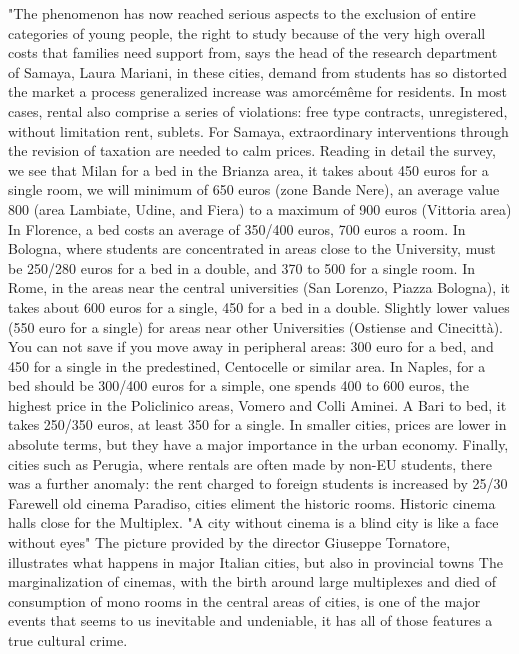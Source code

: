 "The phenomenon has now reached serious aspects to the exclusion of entire categories of young people, the right to study because of the very high overall costs that families need support from, says the head of the research department of Samaya, Laura Mariani, in these cities, demand from students has so distorted the market a process generalized increase was amorcémême for residents.
In most cases, rental also comprise a series of violations: free type contracts, unregistered, without limitation rent, sublets.
For Samaya, extraordinary interventions through the revision of taxation are needed to calm prices.
Reading in detail the survey, we see that Milan for a bed in the Brianza area, it takes about 450 euros for a single room, we will minimum of 650 euros (zone Bande Nere), an average value 800 (area Lambiate, Udine, and Fiera) to a maximum of 900 euros (Vittoria area)
In Florence, a bed costs an average of 350/400 euros, 700 euros a room.
In Bologna, where students are concentrated in areas close to the University, must be 250/280 euros for a bed in a double, and 370 to 500 for a single room.
In Rome, in the areas near the central universities (San Lorenzo, Piazza Bologna), it takes about 600 euros for a single, 450 for a bed in a double.
Slightly lower values ​​(550 euro for a single) for areas near other Universities (Ostiense and Cinecittà).
You can not save if you move away in peripheral areas: 300 euro for a bed, and 450 for a single in the predestined, Centocelle or similar area.
In Naples, for a bed should be 300/400 euros for a simple, one spends 400 to 600 euros, the highest price in the Policlinico areas, Vomero and Colli Aminei.
A Bari to bed, it takes 250/350 euros, at least 350 for a single.
In smaller cities, prices are lower in absolute terms, but they have a major importance in the urban economy.
Finally, cities such as Perugia, where rentals are often made by non-EU students, there was a further anomaly: the rent charged to foreign students is increased by 25/30%
Farewell old cinema Paradiso, cities eliment the historic rooms.
Historic cinema halls close for the Multiplex.
"A city without cinema is a blind city is like a face without eyes"
The picture provided by the director Giuseppe Tornatore, illustrates what happens in major Italian cities, but also in provincial towns
The marginalization of cinemas, with the birth around large multiplexes and died of consumption of mono rooms in the central areas of cities, is one of the major events that seems to us inevitable and undeniable, it has all of those features a true cultural crime.
